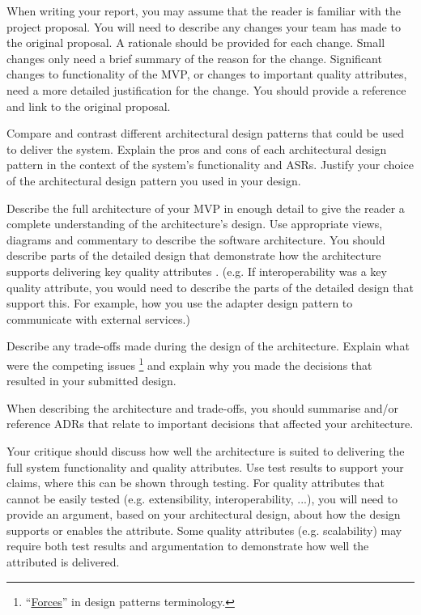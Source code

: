 \documentclass{csse4400}
\begin{document}
When writing your report, you may assume that the reader is familiar with the project proposal.
You will need to describe any changes your team has made to the original proposal.
A rationale should be provided for each change.
Small changes only need a brief summary of the reason for the change.
Significant changes to functionality of the MVP, or changes to important quality attributes,
need a more detailed justification for the change.
You should provide a reference and link to the original proposal.

Compare and contrast different architectural design patterns that could be used to deliver the system.
Explain the pros and cons of each architectural design pattern in the context of the system's functionality and ASRs.
Justify your choice of the architectural design pattern you used in your design.

Describe the full architecture of your MVP in enough detail
to give the reader a complete understanding of the architecture's design.
Use appropriate views, diagrams and commentary to describe the software architecture.
You should describe parts of the detailed design that demonstrate how the architecture supports delivering key quality attributes \cite{view-notes}.
(e.g. If interoperability was a key quality attribute, you would need to describe the parts of the detailed design that support this.
For example, how you use the adapter design pattern to communicate with external services.)

Describe any trade-offs made during the design of the architecture.
Explain what were the competing issues%
\footnote{``\href{http://www.cs.unc.edu/~stotts/COMP723-s15/patterns/forces.html}{Forces}'' in design patterns terminology.}
and explain why you made the decisions that resulted in your submitted design.

When describing the architecture and trade-offs,
you should summarise and/or reference ADRs that relate to important decisions that affected your architecture.

Your critique should discuss how well the architecture is suited to delivering the full system functionality and quality attributes.
Use test results to support your claims, where this can be shown through testing.
For quality attributes that cannot be easily tested (e.g. extensibility, interoperability, ...),
you will need to provide an argument, based on your architectural design, about how the design supports or enables the attribute.
Some quality attributes (e.g. scalability) may require both test results
and argumentation to demonstrate how well the attributed is delivered.
\end{document}
